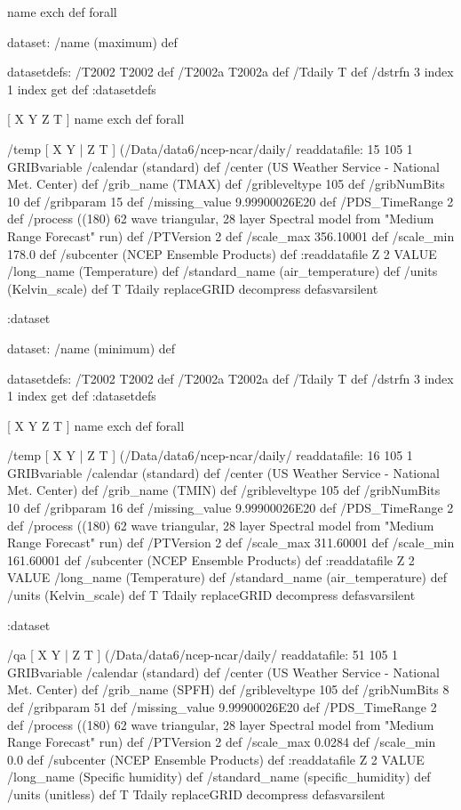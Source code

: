 \begin{ingrid}
  [ X Y Z Z0 T ] { name exch def } forall

  dataset: /name (maximum) def

   datasetdefs:
   /T2002 T2002 def
   /T2002a T2002a def
   /Tdaily T def
   /dstrfn 3 index 1 index get def
   :datasetdefs

   [ X Y Z T ] { name exch def } forall

   /temp { [ X Y | Z T ] (/Data/data6/ncep-ncar/daily/%
   readdatafile:
   15 105 1 GRIBvariable
   /calendar (standard) def
   /center (US Weather Service - National Met. Center) def
   /grib_name (TMAX) def
   /gribleveltype 105 def
   /gribNumBits 10 def
   /gribparam 15 def
   /missing_value 9.99900026E20 def 
   /PDS_TimeRange 2 def
   /process ((180) 62 wave triangular, 28 layer Spectral model from "Medium Range Forecast" run) def
   /PTVersion 2 def
   /scale_max 356.10001 def
   /scale_min 178.0 def
   /subcenter (NCEP Ensemble Products) def
   :readdatafile
   Z 2 VALUE
   /long_name (Temperature) def
   /standard_name (air_temperature) def
   /units (Kelvin_scale) def
   T Tdaily replaceGRID 
   decompress
   } defasvarsilent

  :dataset

  dataset: /name (minimum) def

   datasetdefs:
   /T2002 T2002 def
   /T2002a T2002a def
   /Tdaily T def
   /dstrfn 3 index 1 index get def
   :datasetdefs

   [ X Y Z T ] { name exch def } forall

   /temp { [ X Y | Z T ] (/Data/data6/ncep-ncar/daily/%
   readdatafile:
   16 105 1 GRIBvariable
   /calendar (standard) def
   /center (US Weather Service - National Met. Center) def
   /grib_name (TMIN) def
   /gribleveltype 105 def
   /gribNumBits 10 def
   /gribparam 16 def
   /missing_value 9.99900026E20 def 
   /PDS_TimeRange 2 def
   /process ((180) 62 wave triangular, 28 layer Spectral model from "Medium Range Forecast" run) def
   /PTVersion 2 def
   /scale_max 311.60001 def
   /scale_min 161.60001 def
   /subcenter (NCEP Ensemble Products) def
   :readdatafile
   Z 2 VALUE
   /long_name (Temperature) def
   /standard_name (air_temperature) def
   /units (Kelvin_scale) def
   T Tdaily replaceGRID 
   decompress
   } defasvarsilent

  :dataset

   /qa { [ X Y | Z T ] (/Data/data6/ncep-ncar/daily/%
   readdatafile:
   51 105 1 GRIBvariable
   /calendar (standard) def
   /center (US Weather Service - National Met. Center) def
   /grib_name (SPFH) def
   /gribleveltype 105 def
   /gribNumBits 8 def
   /gribparam 51 def
   /missing_value 9.99900026E20 def 
   /PDS_TimeRange 2 def
   /process ((180) 62 wave triangular, 28 layer Spectral model from "Medium Range Forecast" run) def
   /PTVersion 2 def
   /scale_max 0.0284 def
   /scale_min 0.0 def
   /subcenter (NCEP Ensemble Products) def
   :readdatafile
   Z 2 VALUE
   /long_name (Specific humidity) def
   /standard_name (specific_humidity) def
   /units (unitless) def
   T Tdaily replaceGRID 
   decompress
   } defasvarsilent


\end{ingrid}
